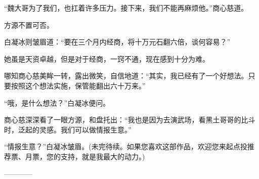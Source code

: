 \begin{this_body}
“魏大哥为了我们，也扛着许多压力。接下来，我们不能再麻烦他。”商心慈道。

方源不置可否。

白凝冰则皱眉道：“要在三个月内经商，将十万元石翻六倍，谈何容易？”

她虽是天资卓越，但是对于经商，一窍不通，现在感到十分为难。

哪知商心慈美眸一转，露出微笑，自信地道：“其实，我已经有了一个好想法。只要按照这个想法实施，保管能翻出六十万来。”

“哦，是什么想法？”白凝冰便问。

商心慈深深看了一眼方源，和盘托出：“我也是因为去演武场，看黑土哥哥的比斗时，泛起的灵感。我们可以做情报生意。”

“情报生意？”白凝冰皱眉。(未完待续。如果您喜欢这部作品，欢迎您来起点投推荐票、月票，您的支持，就是我最大的动力。)

------------

\end{this_body}

